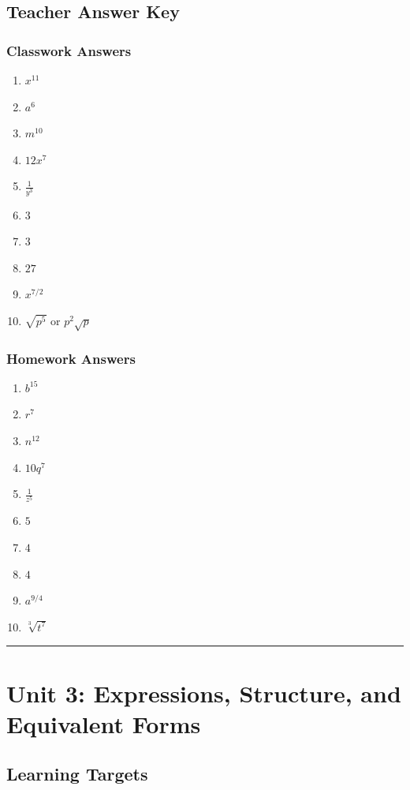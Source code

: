 \documentclass[11pt]{book}
\begin{document}
\section{Teacher Answer Key}

\subsection{Classwork Answers}

\begin{enumerate}
\item \(x^{11}\)
\item \(a^6\)
\item \(m^{10}\)
\item \(12x^7\)
\item \(\frac1{y^3}\)
\item \(3\)
\item \(3\)
\item \(27\)
\item \(x^{7/2}\)
\item \(\sqrt{p^5}\) or \(p^2\sqrt p\)
\end{enumerate}

\subsection{Homework Answers}

\begin{enumerate}
\item \(b^{15}\)
\item \(r^7\)
\item \(n^{12}\)
\item \(10q^7\)
\item \(\frac1{z^5}\)
\item \(5\)
\item \(4\)
\item \(4\)
\item \(a^{9/4}\)
\item \(\sqrt[3]{t^7}\)
\end{enumerate}

\bigskip\hrule\bigskip

\chapter{Unit 3: Expressions, Structure, and Equivalent Forms}

\section{Learning Targets}
\end{document}
